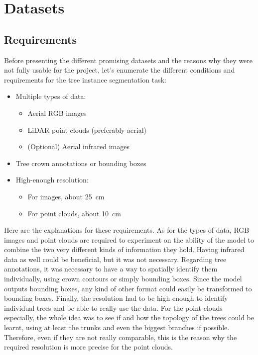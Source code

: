 \documentclass[
]{report}
\providecommand{\tightlist}{%
  \setlength{\itemsep}{0pt}\setlength{\parskip}{0pt}}\usepackage{longtable,booktabs,array}
\begin{document}
\section{Datasets}\label{datasets}

\subsection{Requirements}\label{requirements}

Before presenting the different promising datasets and the reasons why
they were not fully usable for the project, let's enumerate the
different conditions and requirements for the tree instance segmentation
task:

\begin{itemize}
\tightlist
\item
  Multiple types of data:

  \begin{itemize}
  \tightlist
  \item
    Aerial RGB images
  \item
    LiDAR point clouds (preferably aerial)
  \item
    (Optional) Aerial infrared images
  \end{itemize}
\item
  Tree crown annotations or bounding boxes
\item
  High-enough resolution:

  \begin{itemize}
  \tightlist
  \item
    For images, about 25~cm
  \item
    For point clouds, about 10~cm
  \end{itemize}
\end{itemize}

Here are the explanations for these requirements. As for the types of
data, RGB images and point clouds are required to experiment on the
ability of the model to combine the two very different kinds of
information they hold. Having infrared data as well could be beneficial,
but it was not necessary. Regarding tree annotations, it was necessary
to have a way to spatially identify them individually, using crown
contours or simply bounding boxes. Since the model outputs bounding
boxes, any kind of other format could easily be transformed to bounding
boxes. Finally, the resolution had to be high enough to identify
individual trees and be able to really use the data. For the point
clouds especially, the whole idea was to see if and how the topology of
the trees could be learnt, using at least the trunks and even the
biggest branches if possible. Therefore, even if they are not really
comparable, this is the reason why the required resolution is more
precise for the point clouds.
\end{document}
